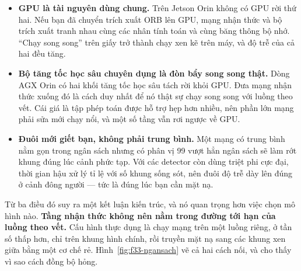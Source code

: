 \documentclass[../../deep_learning.tex]{subfiles}
\begin{document}
\begin{itemize}
\item \textbf{GPU là tài nguyên dùng chung.} Trên Jetson Orin không có GPU rời thứ hai. Nếu bạn đã chuyển trích xuất ORB lên GPU, mạng nhận thức và bộ trích xuất tranh nhau cùng các nhân tính toán và cùng băng thông bộ nhớ. ``Chạy song song'' trên giấy trở thành chạy xen kẽ trên máy, và độ trễ của cả hai đều tăng.
\item \textbf{Bộ tăng tốc học sâu chuyên dụng là đòn bẩy song song thật.} Dòng AGX Orin có hai khối tăng tốc học sâu tách rời khỏi GPU. Đưa mạng nhận thức xuống đó là cách duy nhất để nó thật sự chạy song song với luồng theo vết. Cái giá là tập phép toán được hỗ trợ hẹp hơn nhiều, nên phần lớn mạng phải sửa mới chạy nổi, và một số tầng vẫn rơi ngược về GPU.
\item \textbf{Đuôi mới giết bạn, không phải trung bình.} Một mạng có trung bình nằm gọn trong ngân sách nhưng có phân vị 99 vượt hẳn ngân sách sẽ làm rớt khung đúng lúc cảnh phức tạp. Với các detector còn dùng triệt phi cực đại, thời gian hậu xử lý tỉ lệ với số khung sống sót, nên đuôi độ trễ dày lên đúng ở cảnh đông người --- tức là đúng lúc bạn cần mặt nạ.
\end{itemize}

Từ ba điều đó suy ra một kết luận kiến trúc, và nó quan trọng hơn việc chọn mô hình nào. \textbf{Tầng nhận thức không nên nằm trong đường tới hạn của luồng theo vết.} Cấu hình thực dụng là chạy mạng trên một luồng riêng, ở tần số thấp hơn, chỉ trên khung hình chính, rồi truyền mặt nạ sang các khung xen giữa bằng một cơ chế rẻ. Hình~\ref{fig:f33-ngansach} vẽ cả hai cách nối, và cho thấy vì sao cách đồng bộ hỏng.
\end{document}
